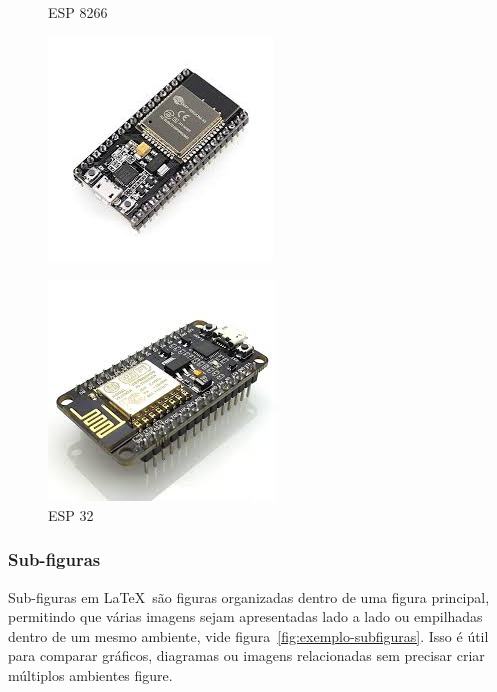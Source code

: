 \begin{figure}[htb]
 \label{teste}
 \centering
  \begin{minipage}{0.4\textwidth}
    \centering
    \caption{ESP 8266} \label{fig_minipage_imagem1}
    \includegraphics[scale=0.4]{img/esp32.jpeg}
  \end{minipage}
  \hfill
  \begin{minipage}{0.4\textwidth}
    \centering
    \caption{ESP 32} \label{fig_minipage_grafico2}
    \includegraphics[scale=0.38]{img/esp8266.jpeg}
    \vspace{2mm}
  \end{minipage}
\end{figure}

\subsubsection{Sub-figuras}
Sub-figuras em \LaTeX\ são figuras organizadas dentro de uma figura principal, permitindo que várias imagens sejam apresentadas lado a lado ou empilhadas dentro de um mesmo ambiente, vide figura~\ref{fig:exemplo-subfiguras}. Isso é útil para comparar gráficos, diagramas ou imagens relacionadas sem precisar criar múltiplos ambientes figure.

